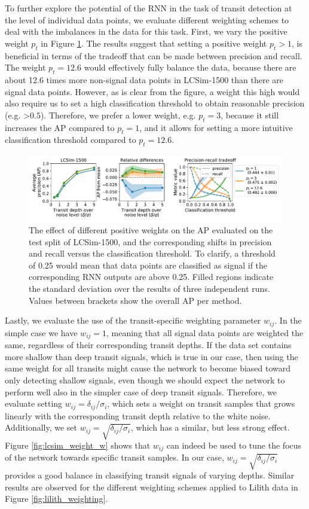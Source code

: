 To further explore the potential of the RNN in the task of transit detection at the level of individual data points, we evaluate different weighting schemes to deal with the imbalances in the data for this task. First, we vary the positive weight $p_t$ in Figure \ref{fig:lcsim_weight_p}. The results suggest that setting a positive weight $p_t > 1$, is beneficial in terms of the tradeoff that can be made between precision and recall. The weight $p_t=12.6$ would effectively fully balance the data, because there are about 12.6 times more non-signal data points in LCSim-1500 than there are signal data points. However, as is clear from the figure, a weight this high would also require us to set a high classification threshold to obtain reasonable precision (e.g. >$0.5$). Therefore, we prefer a lower weight, e.g. $p_t = 3$, because it still increases the AP compared to $p_t = 1$, and it allows for setting a more intuitive classification threshold compared to $p_t = 12.6$.
\begin{figure}
    \centering
    \includegraphics[width=0.9\linewidth]{Experiments/Figures/Models/lcsim1500_AP_weighting-p.pdf}
    \caption{The effect of different positive weights on the AP evaluated on the test split of LCSim-1500, and the corresponding shifts in precision and recall versus the classification threshold. To clarify, a threshold of 0.25 would mean that data points are classified as signal if the corresponding RNN outputs are above 0.25. Filled regions indicate the standard deviation over the results of three independent runs. Values between brackets show the overall AP per method.}
    \label{fig:lcsim_weight_p}
\end{figure}

Lastly, we evaluate the use of the transit-specific weighting parameter $w_{ij}$. In the simple case we have $w_{ij} = 1$, meaning that all signal data points are weighted the same, regardless of their corresponding transit depths. If the data set contains more shallow than deep transit signals, which is true in our case, then using the same weight for all transits might cause the network to become biased toward only detecting shallow signals, even though we should expect the network to perform well also in the simpler case of deep transit signals. Therefore, we evaluate setting $w_{ij} = \delta_{ij}/\sigma_i$, which sets a weight on transit samples that grows linearly with the corresponding transit depth relative to the white noise. Additionally, we set $w_{ij} = \sqrt{\delta_{ij}/\sigma_i}$, which has a similar, but less strong effect. Figure \ref{fig:lcsim_weight_w} shows that $w_{ij}$ can indeed be used to tune the focus of the network towards specific transit samples. In our case, $w_{ij} = \sqrt{\delta_{ij}/\sigma_i}$ provides a good balance in classifying transit signals of varying depths. Similar results are observed for the different weighting schemes applied to Lilith data in Figure \ref{fig:lilith_weighting}.

